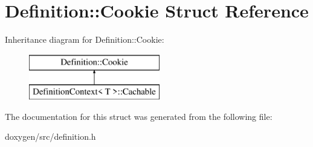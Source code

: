 \hypertarget{struct_definition_1_1_cookie}{}\section{Definition\+::Cookie Struct Reference}
\label{struct_definition_1_1_cookie}
Inheritance diagram for Definition\+::Cookie\+:\begin{figure}[H]
\begin{center}
\leavevmode
\includegraphics[height=2.000000cm]{struct_definition_1_1_cookie}
\end{center}
\end{figure}


The documentation for this struct was generated from the following file\+:\begin{DoxyCompactItemize}
\item 
doxygen/src/definition.\+h\end{DoxyCompactItemize}
